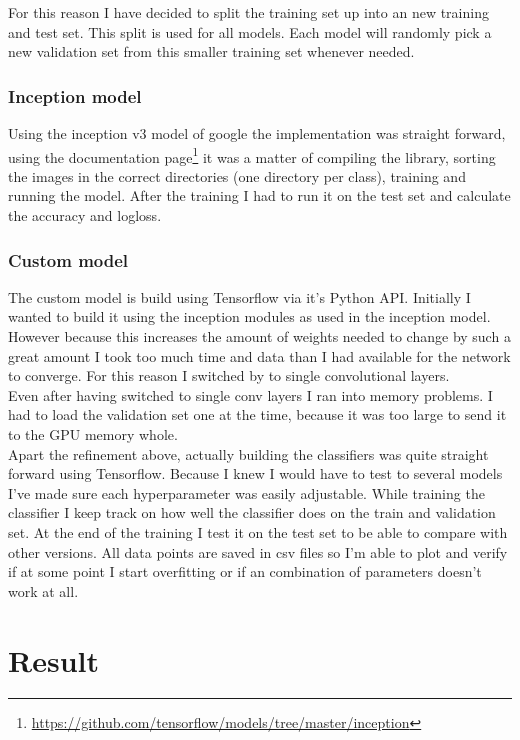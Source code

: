 \documentclass[11pt]{article}
\begin{document}
For this reason I have decided to split the training set up into an new training and test set. This split is used for all models. Each model will randomly pick a new validation set from this smaller training set whenever needed.

\subsubsection{Inception model}
Using the inception v3 model of google the implementation was straight forward, using the documentation page\footnote{\url{https://github.com/tensorflow/models/tree/master/inception}} it was a matter of compiling the library, sorting the images in the correct directories (one directory per class), training and running the model. After the training I had to run it on the test set and calculate the accuracy and logloss.

\subsubsection{Custom model}
The custom model is build using Tensorflow via it's Python API. Initially I wanted to build it using the inception modules as used in the inception model. However because this increases the amount of weights needed to change by such a great amount I took too much time and data than I had available for the network to converge. For this reason I switched by to single convolutional layers.\\

Even after having switched to single conv layers I ran into memory problems. I had to load the validation set one at the time, because it was too large to send it to the GPU memory whole.\\

Apart the refinement above, actually building the classifiers was quite straight forward using Tensorflow. Because I knew I would have to test to several models I've made sure each hyperparameter was easily adjustable. While training the classifier I keep track on how well the classifier does on the train and validation set. At the end of the training I test it on the test set to be able to compare with other versions. All data points are saved in csv files so I'm able to plot and verify if at some point I start overfitting or if an combination of parameters doesn't work at all.

\section{Result}
\end{document}

